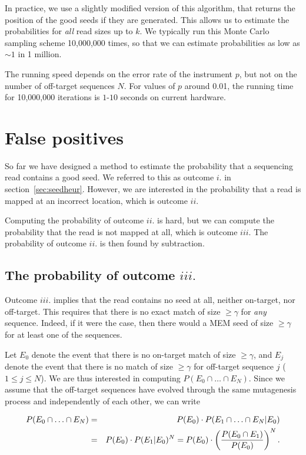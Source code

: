 \documentclass{article}
\begin{document}
In practice, we use a slightly modified version of this algorithm, that
returns the position of the good seeds if they are generated. This allows
us to estimate the probabilities for \emph{all} read sizes up to $k$. We
typically run this Monte Carlo sampling scheme 10,000,000 times, so that
we can estimate probabilities as low as $\sim1$ in 1 million.

The running speed depends on the error rate of the instrument $p$, but not
on the number of off-target sequences $N$. For values of $p$ around 0.01,
the running time for 10,000,000 iterations is $1$-$10$ seconds on current
hardware.

\section{False positives}

So far we have designed a method to estimate the probability that a
sequencing read contains a good seed. We referred to this as outcome $i.$
in section~\ref{sec:seedheur}. However, we are interested in the
probability that a read is mapped at an incorrect location, which is
outcome $ii.$

Computing the probability of outcome $ii.$ is hard, but we can compute the
probability that the read is not mapped at all, which is outcome $iii.$
The probability of outcome $ii.$ is then found by subtraction.

\subsection{The probability of outcome $iii.$}

Outcome $iii.$ implies that the read contains no seed at all, neither
on-target, nor off-target. This requires that there is no exact match of
size $\geq \gamma$ for \emph{any} sequence. Indeed, if it were the case,
then there would a MEM seed of size $\geq \gamma$ for at least one of the
sequences.

Let $E_0$ denote the event that there is no on-target match of size $\geq
\gamma$, and $E_j$ denote the event that there is no match of size $\geq
\gamma$ for off-target sequence $j$ ($1 \leq j \leq N$). We are thus
interested in computing $P(E_0 \cap \ldots \cap E_N)$. Since we assume
that the off-target sequences have evolved through the same mutagenesis
process and independently of each other, we can write

\begin{eqnarray}
\notag
P(E_0 \cap \ldots \cap E_N) &=&
  P(E_0) \cdot P(E_1 \cap \ldots \cap E_N | E_0) \\
\label{eq:PE0E1}
  &=& P(E_0) \cdot P(E_1 | E_0)^N =
  P(E_0) \cdot \left( \frac{P(E_0 \cap E_1)}{P(E_0)} \right)^N.
\end{eqnarray}
\end{document}
